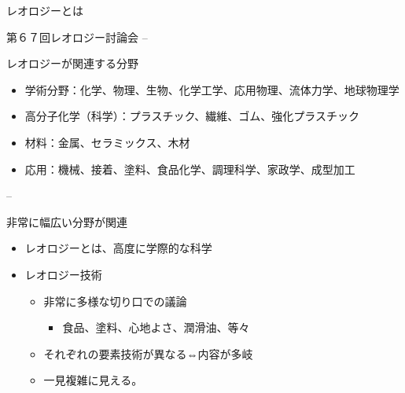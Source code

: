 \begin{frame}{レオロジーとは}
\begin{block}{第６７回レオロジー討論会}
--

\end{block}

\begin{block}{レオロジーが関連する分野}

\begin{itemize}

\item
  学術分野：化学、物理、生物、化学工学、応用物理、流体力学、地球物理学
\item
  高分子化学（科学）：プラスチック、繊維、ゴム、強化プラスチック
\item
  材料：金属、セラミックス、木材
\item
  応用：機械、接着、塗料、食品化学、調理科学、家政学、成型加工
\end{itemize}

--

\end{block}

\begin{block}{非常に幅広い分野が関連}

\begin{itemize}

\item
  レオロジーとは、高度に学際的な科学
\item
  レオロジー技術

  \begin{itemize}
  
  \item
    非常に多様な切り口での議論

    \begin{itemize}
    
    \item
      食品、塗料、心地よさ、潤滑油、等々
    \end{itemize}
  \item
    それぞれの要素技術が異なる⇔内容が多岐
  \item
    一見複雑に見える。
  \end{itemize}
\end{itemize}

\end{block}

\end{frame}

